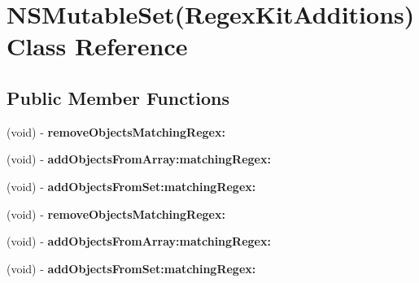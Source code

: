 \hypertarget{interface_n_s_mutable_set_07_regex_kit_additions_08}{\section{N\-S\-Mutable\-Set(Regex\-Kit\-Additions) Class Reference}
\label{interface_n_s_mutable_set_07_regex_kit_additions_08}
}
\subsection*{Public Member Functions}
\begin{DoxyCompactItemize}
\item 
\hypertarget{interface_n_s_mutable_set_07_regex_kit_additions_08_a40f6873a5b8da8a65e6bb302bf305ce7}{(void) -\/ {\bfseries remove\-Objects\-Matching\-Regex\-:}}\label{interface_n_s_mutable_set_07_regex_kit_additions_08_a40f6873a5b8da8a65e6bb302bf305ce7}

\item 
\hypertarget{interface_n_s_mutable_set_07_regex_kit_additions_08_af2258966a47a1c8f726c4ff096894ae7}{(void) -\/ {\bfseries add\-Objects\-From\-Array\-:matching\-Regex\-:}}\label{interface_n_s_mutable_set_07_regex_kit_additions_08_af2258966a47a1c8f726c4ff096894ae7}

\item 
\hypertarget{interface_n_s_mutable_set_07_regex_kit_additions_08_af43b01cfc99083f3e976c153717b2408}{(void) -\/ {\bfseries add\-Objects\-From\-Set\-:matching\-Regex\-:}}\label{interface_n_s_mutable_set_07_regex_kit_additions_08_af43b01cfc99083f3e976c153717b2408}

\item 
\hypertarget{interface_n_s_mutable_set_07_regex_kit_additions_08_a40f6873a5b8da8a65e6bb302bf305ce7}{(void) -\/ {\bfseries remove\-Objects\-Matching\-Regex\-:}}\label{interface_n_s_mutable_set_07_regex_kit_additions_08_a40f6873a5b8da8a65e6bb302bf305ce7}

\item 
\hypertarget{interface_n_s_mutable_set_07_regex_kit_additions_08_af2258966a47a1c8f726c4ff096894ae7}{(void) -\/ {\bfseries add\-Objects\-From\-Array\-:matching\-Regex\-:}}\label{interface_n_s_mutable_set_07_regex_kit_additions_08_af2258966a47a1c8f726c4ff096894ae7}

\item 
\hypertarget{interface_n_s_mutable_set_07_regex_kit_additions_08_af43b01cfc99083f3e976c153717b2408}{(void) -\/ {\bfseries add\-Objects\-From\-Set\-:matching\-Regex\-:}}\label{interface_n_s_mutable_set_07_regex_kit_additions_08_af43b01cfc99083f3e976c153717b2408}

\end{DoxyCompactItemize}


